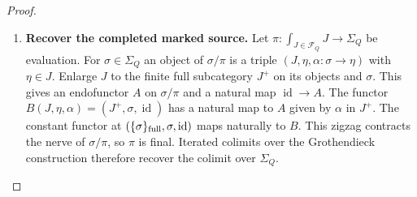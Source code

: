 \documentclass[oneside]{article}
\theoremstyle{plain}
\theoremstyle{definition}
\theoremstyle{remark}
\newcommand{\id}{\operatorname{id}}
\begin{document}
\begin{proof}
\leavevmode
\begin{enumerate}
\item \textbf{Recover the completed marked source.}
Let $\pi:\int_{J\in\mathcal F_Q} J\to\Sigma_Q$ be evaluation.
For $\sigma\in\Sigma_Q$ an object of $\sigma/\pi$ is a triple
$(J,\eta,\alpha:\sigma\to\eta)$ with $\eta\in J$. Enlarge $J$
to the finite full subcategory $J^+$ on its objects and $\sigma$.
This gives an endofunctor $A$ on $\sigma/\pi$ and a natural map
$\id\to A$. The functor
$B(J,\eta,\alpha)=(J^+,\sigma,\id)$ has a natural map to $A$
given by $\alpha$ in $J^+$. The constant functor at
$(\{\sigma\}_{\rm full},\sigma,\id)$ maps naturally to $B$.
This zigzag contracts the nerve of $\sigma/\pi$, so $\pi$ is final.
Iterated colimits over the Grothendieck construction therefore
recover the colimit over $\Sigma_Q$.


\end{enumerate}
\end{proof}
\end{document}

